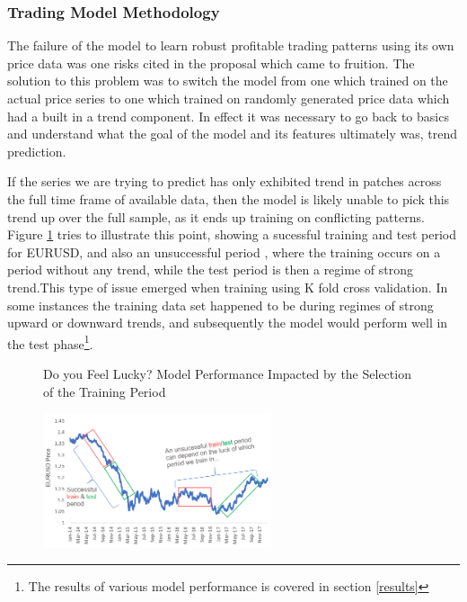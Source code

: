 \documentclass[11pt]{article}
\begin{document}
\subsubsection{Trading Model Methodology} \label{rand}
The failure of the model to learn robust profitable trading patterns using its own price data was one risks cited in the proposal which came to fruition. The solution to this problem was to switch the model from one which trained on the actual price series to one which trained on randomly generated price data which had a built in a trend component. In effect it was necessary to go back to basics and understand what the goal of the model and its features ultimately was, trend prediction.\par
If the series we are trying to predict has only exhibited trend in patches across the full time frame of available data, then the model is likely unable to pick this trend up over the full sample, as it ends up training on conflicting patterns. Figure \ref{fig:train_test_periods_matter} tries to illustrate this point, showing a sucessful training and test period for EURUSD, and also an unsuccessful period , where the training occurs on a period without any trend, while the test period is then a regime of strong trend.This type of issue emerged when training using K fold cross validation. In some instances the training data set happened to be during regimes of strong upward or downward trends, and subsequently the model would perform well in the test phase\footnote{The results of various model performance is covered in section \ref{results}}. 
\begin{figure}[h]
    \centering
	\caption{Do you Feel Lucky? Model Performance Impacted by the Selection of the Training Period}    
	\includegraphics[width=0.6\textwidth]{train_test_periods_matter}
    \label{fig:train_test_periods_matter}
     \caption*{}
\end{figure}
\end{document}
